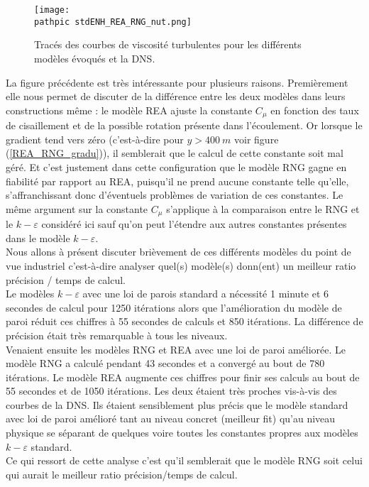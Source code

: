 \documentclass[a4paper,10pt]{article}
\newcommand\pathpic{/home/saura/Documents/Latex_files/Pic/}
\newcommand{\cad}{c'est-à-dire }
\newcommand{\keps}{$k-\varepsilon$}
\begin{document}
\begin{figure}[ht!]
\centering
\texttt{[image: \\pathpic stdENH\_REA\_RNG\_nut.png]}
\caption{\footnotesize{Tracés des courbes de viscosité turbulentes pour les différents modèles évoqués et la DNS.}}
\label{stdENH_REA_RNG_nut}
\end{figure}

La figure précédente est très intéressante pour plusieurs raisons. Premièrement elle nous permet de discuter de la différence entre les deux modèles dans leurs constructions même : le modèle REA ajuste la constante $C_\mu$ en fonction des taux de cisaillement et de la possible rotation présente dans l'écoulement. Or lorsque le gradient tend vers zéro (\cad pour $y > 400 \ m$ voir figure (\ref{REA_RNG_gradu})), il semblerait que le calcul de cette constante soit mal géré. Et c'est justement dans cette configuration que le modèle RNG gagne en fiabilité par rapport au REA, puisqu'il ne prend aucune constante telle qu'elle, s'affranchissant donc d'éventuels problèmes de variation de ces constantes. Le même argument sur la constante $C_\mu$ s'applique à la comparaison entre le RNG et le \keps $ $ considéré ici sauf qu'on peut l'étendre aux autres constantes présentes dans le modèle \keps. \\

\noindent Nous allons à présent discuter brièvement de ces différents modèles du point de vue industriel \cad analyser quel(s) modèle(s) donn(ent) un meilleur ratio précision / temps de calcul.\\
Le modèles \keps $ $ avec une loi de parois standard a nécessité 1 minute et 6 secondes de calcul pour 1250 itérations alors que l'amélioration du modèle de paroi réduit ces chiffres à 55 secondes de calculs et 850 itérations. La différence de précision était très remarquable à tous les niveaux.\\
Venaient ensuite les modèles RNG et REA avec une loi de paroi améliorée. Le modèle RNG a calculé pendant 43 secondes et a convergé au bout de 780 itérations. Le modèle REA augmente ces chiffres pour finir ses calculs au bout de 55 secondes et de 1050 itérations. Les deux étaient très proches vis-à-vis des courbes de la DNS. Ils étaient sensiblement plus précis que le modèle standard avec loi de paroi amélioré tant au niveau concret (meilleur fit) qu'au niveau physique se séparant de quelques voire toutes les constantes propres aux modèles \keps $ $ standard.\\
Ce qui ressort de cette analyse c'est qu'il semblerait que le modèle RNG soit celui qui aurait le meilleur ratio précision/temps de calcul.\\
 
\end{document}
